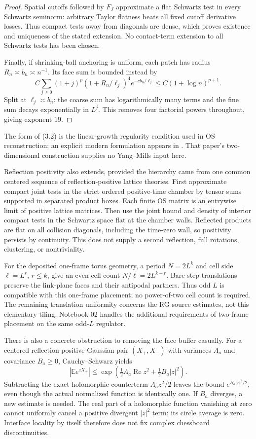 \documentclass[11pt]{article}
\theoremstyle{remark}
\newcommand{\E}{\mathbb E}
\newcommand{\Rea}{\operatorname{Re}}
\begin{document}
\begin{proof}
Spatial cutoffs followed by $F_J$ approximate a flat Schwartz test in
every Schwartz seminorm: arbitrary Taylor flatness beats all fixed
cutoff derivative losses. Thus compact tests away from diagonals are
dense, which proves existence and uniqueness of the stated extension.
No contact-term extension to all Schwartz tests has been chosen.

Finally, if shrinking-ball anchoring is uniform, each patch has radius
$R_n\asymp b_n\asymp n^{-1}$. Its face sum is bounded instead by
\[
 C\sum_{j\geq0}(1+j)^p(1+R_n/\ell_j)^4e^{-cb_n/\ell_j}
 \leq C(1+\log n)^{p+1}.
\]
Split at $\ell_j\asymp b_n$: the coarse sum has logarithmically many
terms and the fine sum decays exponentially in $L^j$.
This removes four factorial powers throughout, giving exponent $19$.
\end{proof}

The form of (3.2) is the linear-growth regularity condition used in OS
reconstruction; an explicit modern formulation appears in
\cite[Section 2.5, equation (22)]{amt}. That paper's two-dimensional
construction supplies no Yang--Mills input here.

Reflection positivity also extends, provided the hierarchy came from
one common centered sequence of reflection-positive lattice theories.
First approximate compact joint tests in the strict ordered positive-time
chamber by tensor sums supported in separated product boxes. Each finite
OS matrix is an entrywise limit of positive lattice matrices. Then use
the joint bound and density of interior compact tests in the Schwartz
space flat at the chamber walls. Reflected products are flat on all
collision diagonals, including the time-zero wall, so positivity
persists by continuity. This does not supply a second reflection,
full rotations, clustering, or nontriviality.

For the deposited one-frame torus geometry, a period $N=2L^k$ and
cell side $\ell=L^r$, $r\leq k$, give an even cell count
$N/\ell=2L^{k-r}$. Bare-step translations preserve the link-plane
faces and their antipodal partners. Thus odd $L$ is compatible with
this one-frame placement; no power-of-two cell count is required.
The remaining translation uniformity concerns the RG source estimates,
not this elementary tiling. Notebook 02 handles the additional
requirements of two-frame placement on the same odd-$L$ regulator.

There is also a concrete obstruction to removing the face buffer casually.
For a centered reflection-positive Gaussian pair $(X_+,X_-)$ with variances $A_a$
and covariance $B_a\geq0$, Cauchy--Schwarz yields
\[
|\E e^{zX_+}|
\leq \exp\!\left(\tfrac12 A_a\Rea z^2+\tfrac12B_a|z|^2\right).
\]
Subtracting the exact holomorphic counterterm $A_az^2/2$ leaves the
bound $e^{B_a|z|^2/2}$, even though the actual normalized function is
identically one. If $B_a$ diverges, a new estimate is needed.
The real part of a holomorphic function vanishing at zero cannot
uniformly cancel a positive divergent $|z|^2$ term: its circle average is
zero. Interface locality by itself therefore does not fix complex
chessboard discontinuities.
\end{document}
